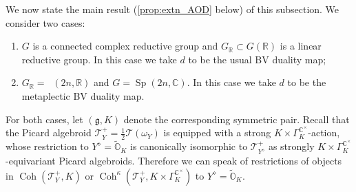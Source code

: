 \documentclass[11pt, a4paper]{amsart}
\newcommand{\C}{\mathbb{C}}
\newcommand{\g}{\mathfrak{g}}
\newcommand{\orb}{\mathbb{O}}
\newcommand{\torbk}{\widetilde{\orb}_{K}}
\newcommand{\cE}{\mathcal{E}}
\newcommand{\tGamma}{\widetilde{\Gamma}}
\DeclareMathOperator{\Coh}{Coh}
\DeclareMathOperator{\Mp}{\widetilde{Sp}}
\newcommand{\Sp}{\operatorname{Sp}}
\newcommand{\R}{\mathbb{R}}
\newcommand{\TT}{\mathscr{T}}
\newcommand{\cm}{\C^\times}
\newcommand{\GR}{G_\R}
\theoremstyle{definition}
\numberwithin{equation}{section}
\begin{document}
We now state the main result (\cref{prop:extn_AOD} below) of this subsection. We consider two cases:
\begin{enumerate}[leftmargin=*, itemindent=*]
	\item $G$ is a connected complex reductive group and $\GR \subset G(\R)$ is a linear reductive group. In this case we take $d$ to be the usual BV duality map;
	\item $\GR = \Mp(2n,\R)$ and $G=\Sp(2n,\C)$. In this case we take $d$ to be the metaplectic BV duality map.
\end{enumerate}
For both cases, let $(\g,K)$ denote the corresponding symmetric pair.
Recall that the Picard algebroid $\TT^+_Y = \frac{1}{2} \TT(\omega_Y)$ is equipped with a strong $K \times \Gamma_K^{\cm}$-action, whose restriction to $Y^\diamond = \torbk$ is canonically isomorphic to $\TT^+_{Y^\diamond}$ as strongly $K \times \Gamma_K^{\cm}$-equivariant Picard algebroids. Therefore we can speak of restrictions of objects in $\Coh(\TT^+_Y, K)$ or $\Coh^\kappa(\TT^+_Y, K \times \Gamma_K^{\cm})$ to $Y^\diamond = \torbk$. 
\end{document}
